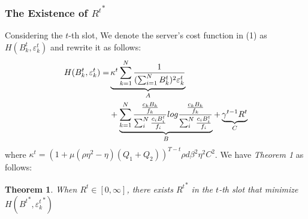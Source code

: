 \documentclass[conference]{IEEEtran}
\newtheorem{theorem}{Theorem}
\begin{document}
\subsubsection{The Existence of ${R^t}^*$}
Considering the $t$-th slot, We denote the server's cost function in (1) as $H(B_k^t, \varepsilon_k^t)$ and rewrite it as follows:
\begin{alignat}{2}
    H(B_k^t, \varepsilon_k^t) = & \underbrace{\kappa^t\sum_{k=1}^{N}{1 \over (\sum_{i=1}^{N}B_k^t)^2 \varepsilon_k^t} \nonumber}_{A} \nonumber\\
                                & + \underbrace{\sum_{k=1}^N {{c_kB_k \over f_k} \over \sum_i^N {c_iB_i^t \over f_i}}log{{c_kB_k \over f_k} \over \sum_i^N {c_iB_i^t \over f_i}}}_{B} + \underbrace{\gamma^{t-1}R^t}_{C} \\
\end{alignat}
where $\kappa^t = (1+\mu(\rho\eta^2-\eta)(Q_1+Q_2))^{T-t}\rho d\beta^2\eta^2C^2$.
We have \textit{Theorem 1} as follows:
\begin{theorem}
    When $R^t \in [0, \infty]$, there exists ${R^t}^*$ in the $t$-th slot that minimize $H({B^t}^*, {\varepsilon_k^t}^*)$
\end{theorem}
\end{document}
